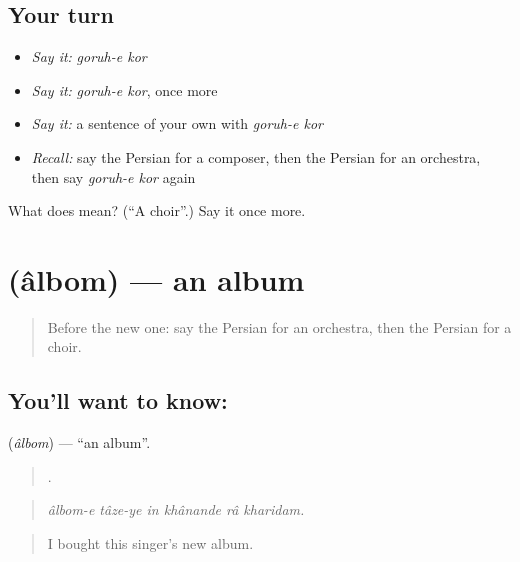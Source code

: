 \subsection*{Your turn}
\begin{itemize}
\raggedright
  \item \emph{Say it:} \emph{goruh-e kor}
  \item \emph{Say it:} \emph{goruh-e kor}, once more
  \item \emph{Say it:} a sentence of your own with \emph{goruh-e kor}
  \item \emph{Recall:} say the Persian for a composer, then the Persian for an orchestra, then say \emph{goruh-e kor} again
\end{itemize}

\begin{tcolorbox}[breakable,colback=teal!4,colframe=teal!35!black,title={Before you move on}]
What does   mean? (\textquotedblleft{}A choir\textquotedblright{}.) Say it once more.
\end{tcolorbox}
\section[\texorpdfstring{\fa{آلبوم} (âlbom)}{آلبوم (âlbom)}]{ (âlbom) — an album}

\label{lesson:FA-C520-albom}



\begin{quote}
Before the new one: say the Persian for an orchestra, then the Persian for a choir.
\end{quote}

\subsection*{You'll want to know: }
\textbf{} (\emph{âlbom}) — \textquotedblleft{}an album\textquotedblright{}.

\begin{quote}
     .
\end{quote}

\begin{quote}
\emph{âlbom-e tâze-ye in khânande râ kharidam.}
\end{quote}

\begin{quote}
I bought this singer's new album.
\end{quote}

